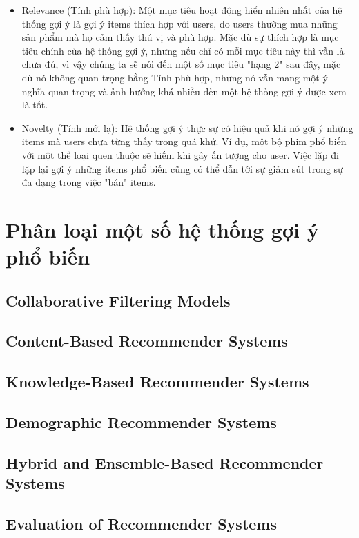 \documentclass[14pt]{article}
\begin{document}
	\begin{itemize}
		\item Relevance (Tính phù hợp): Một mục tiêu hoạt động hiển nhiên nhất của hệ thống gợi ý là gợi ý items thích hợp với users, do users thường mua những sản phẩm mà họ cảm thấy thú vị và phù hợp. Mặc dù sự thích hợp là mục tiêu chính của hệ thống gợi ý, nhưng nếu chỉ có mỗi mục tiêu này thì vẫn là chưa đủ, vì vậy chúng ta sẽ nói đến một số mục tiêu "hạng 2" sau đây, mặc dù nó không quan trọng bằng Tính phù hợp, nhưng nó vẫn mang một ý nghĩa quan trọng và ảnh hưởng khá nhiều đến một hệ thống gợi ý được xem là tốt.
		\item Novelty (Tính mới lạ): Hệ thống gợi ý thực sự có hiệu quả khi nó gợi ý những items mà users chưa từng thấy trong quá khứ. Ví dụ, một bộ phim phổ biến với một thể loại quen thuộc sẽ hiếm khi gây ấn tượng cho user. Việc lặp đi lặp lại gợi ý những items phổ biến cũng có thể dẫn tới sự giảm sút trong sự đa dạng trong việc "bán" items.
	\end{itemize}
	
	\section{Phân loại một số hệ thống gợi ý phổ biến}
	
		\subsection{Collaborative Filtering Models}
		
		\subsection{Content-Based Recommender Systems}
		
		\subsection{Knowledge-Based Recommender Systems}
		
		\subsection{Demographic Recommender Systems}
		
		\subsection{Hybrid and Ensemble-Based Recommender Systems}
		
		\subsection{Evaluation of Recommender Systems}
\end{document}
